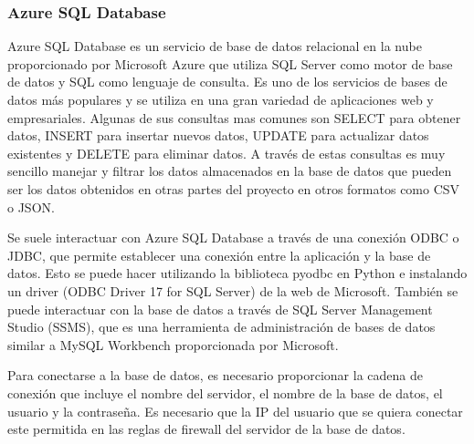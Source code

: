 \subsubsection{Azure SQL Database}

Azure SQL Database es un servicio de base de datos relacional en la nube proporcionado por Microsoft Azure que utiliza SQL Server como motor de base de datos y SQL como lenguaje de consulta.
Es uno de los servicios de bases de datos más populares y se utiliza en una gran variedad de aplicaciones web y empresariales.
Algunas de sus consultas mas comunes son SELECT para obtener datos, INSERT para insertar nuevos datos, UPDATE para actualizar datos existentes y DELETE para eliminar datos.
A través de estas consultas es muy sencillo manejar y filtrar los datos almacenados en la base de datos que pueden ser los datos obtenidos en otras partes del proyecto en otros formatos como CSV o JSON.

Se suele interactuar con Azure SQL Database a través de una conexión ODBC o JDBC, que permite establecer una conexión entre la aplicación y la base de datos. 
Esto se puede hacer utilizando la biblioteca pyodbc en Python e instalando un driver (ODBC Driver 17 for SQL Server) de la web de Microsoft. 
También se puede interactuar con la base de datos a través de SQL Server Management Studio (SSMS), que es una herramienta de administración de bases de datos similar a MySQL Workbench proporcionada por Microsoft.

Para conectarse a la base de datos, es necesario proporcionar la cadena de conexión que incluye el nombre del servidor, el nombre de la base de datos, el usuario y la contraseña.
Es necesario que la IP del usuario que se quiera conectar este permitida en las reglas de firewall del servidor de la base de datos.
